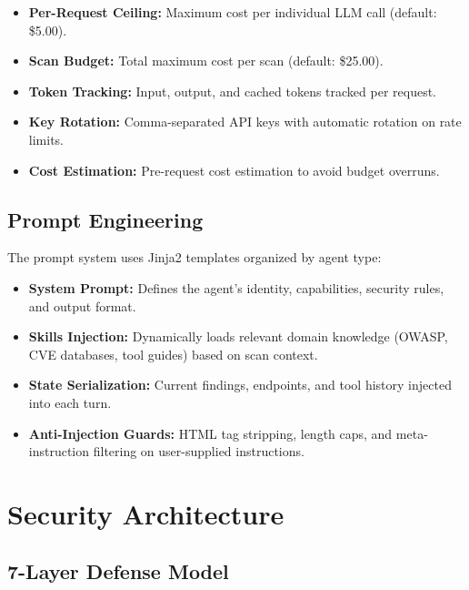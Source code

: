 \documentclass[12pt,a4paper,twoside]{report}
\begin{document}
\begin{infobox}
\begin{itemize}
    \item \textbf{Per-Request Ceiling:} Maximum cost per individual LLM call (default: \$5.00).
    \item \textbf{Scan Budget:} Total maximum cost per scan (default: \$25.00).
    \item \textbf{Token Tracking:} Input, output, and cached tokens tracked per request.
    \item \textbf{Key Rotation:} Comma-separated API keys with automatic rotation on rate limits.
    \item \textbf{Cost Estimation:} Pre-request cost estimation to avoid budget overruns.
\end{itemize}
\end{infobox}

\section{Prompt Engineering}

The prompt system uses Jinja2 templates organized by agent type:

\begin{itemize}
    \item \textbf{System Prompt:} Defines the agent's identity, capabilities, security rules, and output format.
    \item \textbf{Skills Injection:} Dynamically loads relevant domain knowledge (OWASP, CVE databases, tool guides) based on scan context.
    \item \textbf{State Serialization:} Current findings, endpoints, and tool history injected into each turn.
    \item \textbf{Anti-Injection Guards:} HTML tag stripping, length caps, and meta-instruction filtering on user-supplied instructions.
\end{itemize}


\chapter{Security Architecture}
\label{ch:security}

\section{7-Layer Defense Model}
\end{document}
